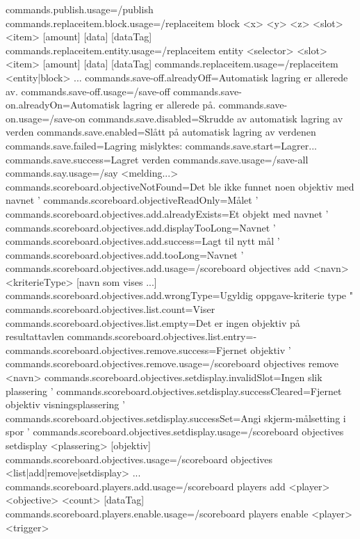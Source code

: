 commands.publish.usage=/publish
commands.replaceitem.block.usage=/replaceitem block <x> <y> <z> <slot> <item> [amount] [data] [dataTag]
commands.replaceitem.entity.usage=/replaceitem entity <selector> <slot> <item> [amount] [data] [dataTag]
commands.replaceitem.usage=/replaceitem <entity|block> ...
commands.save-off.alreadyOff=Automatisk lagring er allerede av.
commands.save-off.usage=/save-off
commands.save-on.alreadyOn=Automatisk lagring er allerede på.
commands.save-on.usage=/save-on
commands.save.disabled=Skrudde av automatisk lagring av verden
commands.save.enabled=Slått på automatisk lagring av verdenen
commands.save.failed=Lagring mislyktes: %
commands.save.start=Lagrer...
commands.save.success=Lagret verden
commands.save.usage=/save-all
commands.say.usage=/say <melding...>
commands.scoreboard.objectiveNotFound=Det ble ikke funnet noen objektiv med navnet '%
commands.scoreboard.objectiveReadOnly=Målet '%
commands.scoreboard.objectives.add.alreadyExists=Et objekt med navnet '%
commands.scoreboard.objectives.add.displayTooLong=Navnet '%
commands.scoreboard.objectives.add.success=Lagt til nytt mål '%
commands.scoreboard.objectives.add.tooLong=Navnet '%
commands.scoreboard.objectives.add.usage=/scoreboard objectives add <navn> <kriterieType> [navn som vises ...]
commands.scoreboard.objectives.add.wrongType=Ugyldig oppgave-kriterie type "%
commands.scoreboard.objectives.list.count=Viser %
commands.scoreboard.objectives.list.empty=Det er ingen objektiv på resultattavlen
commands.scoreboard.objectives.list.entry=-%
commands.scoreboard.objectives.remove.success=Fjernet objektiv '%
commands.scoreboard.objectives.remove.usage=/scoreboard objectives remove <navn>
commands.scoreboard.objectives.setdisplay.invalidSlot=Ingen slik plassering '%
commands.scoreboard.objectives.setdisplay.successCleared=Fjernet objektiv visningsplassering '%
commands.scoreboard.objectives.setdisplay.successSet=Angi skjerm-målsetting i spor '%
commands.scoreboard.objectives.setdisplay.usage=/scoreboard objectives setdisplay <plassering> [objektiv]
commands.scoreboard.objectives.usage=/scoreboard objectives <list|add|remove|setdisplay> ...
commands.scoreboard.players.add.usage=/scoreboard players add <player> <objective> <count> [dataTag]
commands.scoreboard.players.enable.usage=/scoreboard players enable <player> <trigger>
